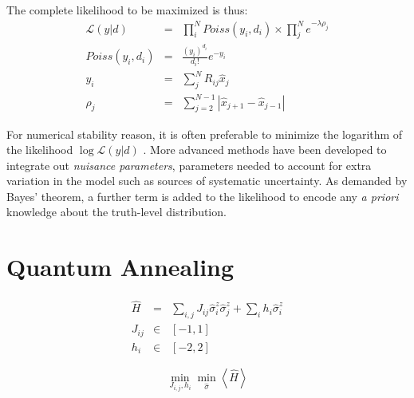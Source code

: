 \documentclass{article}
\begin{document}
\paragraph{}
The complete likelihood to be maximized is thus:
%
\begin{eqnarray}
\mathcal{L}(y|d) & = & \prod_i^N Poiss(y_i, d_i) \times \prod_j^N e^{- \lambda \rho_j} \\
Poiss(y_i, d_i) & = & \frac{(y_i)^{d_i}}{d_i!}e^{-y_i}
\\
y_i & = & \sum_{j}^N R_{ij}\hat{x}_j \\
\rho_j & = & \sum_{j=2}^{N-1} \left | \hat{x}_{j+1} - \hat{x}_{j-1} \right |
\end{eqnarray}

For numerical stability reason, it is often preferable to minimize the logarithm of the likelihood $\log \mathcal{L}(y|d)$ . More advanced methods \cite{dagostini,fbu} have been developed to integrate out {\sl nuisance parameters}, \ie parameters needed to account for extra variation in the model such as sources of systematic uncertainty. As demanded by Bayes' theorem, a further term is added to the likelihood to encode any {\sl a priori} knowledge about the truth-level distribution. 

\section{Quantum Annealing}

\begin{eqnarray}
\hat{H} & = & \sum_{i,j} J_{ij}\hat{\sigma}^z_i \hat{\sigma}^z_j + \sum_i h_i \hat{\sigma}^z_i\\
J_{ij} & \in & [-1,1] \\
h_i  & \in & [-2,2]
\end{eqnarray}

\begin{equation}
    \min_{J_{i,j}, h_i} \min_{\hat{\sigma} }\left < \hat{H} \right >
\end{equation}

\end{document}
